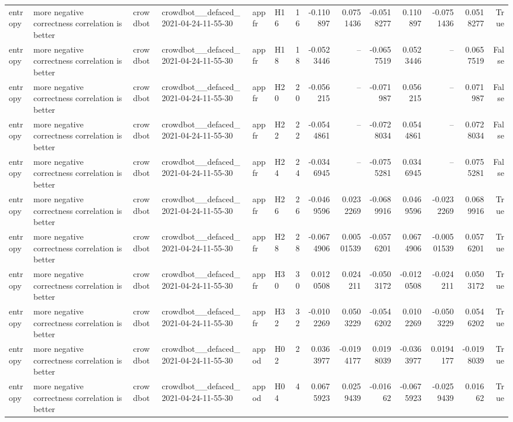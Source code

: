 \begin{longtable}{llllllrrrrrrrr}
entropy & more negative correctness correlation is better & crowdbot & crowdbot\_\_defaced\_2021-04-24-11-55-30 & appfr & H16 & 16 & -0.110897 & 0.0751436 & -0.0518277 & 0.110897 & -0.0751436 & 0.0518277 & True \\
entropy & more negative correctness correlation is better & crowdbot & crowdbot\_\_defaced\_2021-04-24-11-55-30 & appfr & H18 & 18 & -0.0523446 & -- & -0.0657519 & 0.0523446 & -- & 0.0657519 & False \\
entropy & more negative correctness correlation is better & crowdbot & crowdbot\_\_defaced\_2021-04-24-11-55-30 & appfr & H20 & 20 & -0.056215 & -- & -0.071987 & 0.056215 & -- & 0.071987 & False \\
entropy & more negative correctness correlation is better & crowdbot & crowdbot\_\_defaced\_2021-04-24-11-55-30 & appfr & H22 & 22 & -0.0544861 & -- & -0.0728034 & 0.0544861 & -- & 0.0728034 & False \\
entropy & more negative correctness correlation is better & crowdbot & crowdbot\_\_defaced\_2021-04-24-11-55-30 & appfr & H24 & 24 & -0.0346945 & -- & -0.0755281 & 0.0346945 & -- & 0.0755281 & False \\
entropy & more negative correctness correlation is better & crowdbot & crowdbot\_\_defaced\_2021-04-24-11-55-30 & appfr & H26 & 26 & -0.0469596 & 0.0232269 & -0.0689916 & 0.0469596 & -0.0232269 & 0.0689916 & True \\
entropy & more negative correctness correlation is better & crowdbot & crowdbot\_\_defaced\_2021-04-24-11-55-30 & appfr & H28 & 28 & -0.0674906 & 0.00501539 & -0.0576201 & 0.0674906 & -0.00501539 & 0.0576201 & True \\
entropy & more negative correctness correlation is better & crowdbot & crowdbot\_\_defaced\_2021-04-24-11-55-30 & appfr & H30 & 30 & 0.0120508 & 0.024211 & -0.0503172 & -0.0120508 & -0.024211 & 0.0503172 & True \\
entropy & more negative correctness correlation is better & crowdbot & crowdbot\_\_defaced\_2021-04-24-11-55-30 & appfr & H32 & 32 & -0.0102269 & 0.0503229 & -0.0546202 & 0.0102269 & -0.0503229 & 0.0546202 & True \\
entropy & more negative correctness correlation is better & crowdbot & crowdbot\_\_defaced\_2021-04-24-11-55-30 & appod & H02 & 2 & 0.0363977 & -0.0194177 & 0.0198039 & -0.0363977 & 0.0194177 & -0.0198039 & True \\
entropy & more negative correctness correlation is better & crowdbot & crowdbot\_\_defaced\_2021-04-24-11-55-30 & appod & H04 & 4 & 0.0675923 & 0.0259439 & -0.01662 & -0.0675923 & -0.0259439 & 0.01662 & True \\

\end{longtable}
